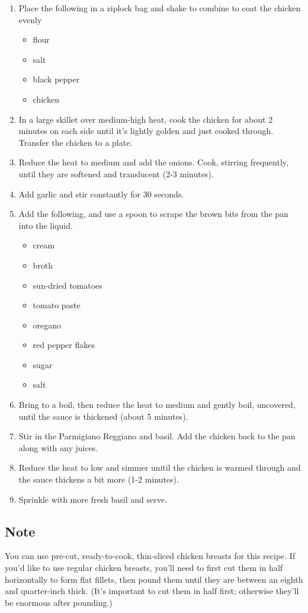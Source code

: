 \begin{enumerate}
\item Place the following in a ziplock bag and shake to combine to coat the chicken evenly
\begin{itemize}
    \item flour
    \item salt
    \item black pepper
    \item chicken
\end{itemize}
\item In a large skillet over medium-high heat, cook the chicken for about 2 minutes on each side until it’s lightly
    golden and just cooked through. Transfer the chicken to a plate.
\item Reduce the heat to medium and add the onions. Cook, stirring frequently, until they are softened and translucent
    (2-3 minutes).
\item Add garlic and stir constantly for 30 seconds.
\item Add the following, and use a spoon to scrape the brown bits from the pan into the liquid.
\begin{itemize}
    \item cream
    \item broth
    \item sun-dried tomatoes
    \item tomato paste
    \item oregano
    \item red pepper flakes
    \item sugar
    \item salt
\end{itemize}
\item Bring to a boil, then reduce the heat to medium and gently boil, uncovered, until the sauce is thickened (about 5
    minutes).
\item Stir in the Parmigiano Reggiano and basil. Add the chicken back to the pan along with any juices.
\item Reduce the heat to low and simmer unitil the chicken is warmed through and the sauce thickens a bit more (1-2
    minutes).
\item Sprinkle with more fresh basil and serve.
\end{enumerate}

\subsection{Note}

You can use pre-cut, ready-to-cook, thin-sliced chicken breasts for this recipe. If you’d like to use regular chicken
breasts, you’ll need to first cut them in half horizontally to form flat fillets, then pound them until they are between
an eighth and quarter-inch thick. (It’s important to cut them in half first; otherwise they’ll be enormous after
pounding.)
